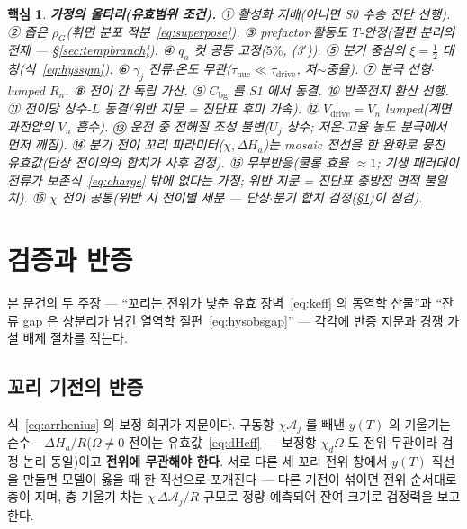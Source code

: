 \documentclass[11pt,a4paper]{article}
\newtheorem*{keybox}{핵심}
\newcommand{\drive}{\mathrm{drive}}
\newcommand{\bg}{\mathrm{bg}}
\begin{document}
\begin{keybox}
\textbf{가정의 울타리(유효범위 조건).}
① 활성화 지배(아니면 S0 수송 진단 선행).
② 좁은 $\rho_G$(휘면 분포 적분~\eqref{eq:superpose}).
③ prefactor$\cdot$활동도 $T$-안정(절편 분리의 전제 — \S\ref{sec:tempbranch}).
④ $q_a$ 컷 공통 고정($5\%$, (3$'$)).
⑤ 분기 중심의 $\xi=\tfrac12$ 대칭(식~\eqref{eq:hyssym}).
⑥ $\gamma_j$ 전류$\cdot$온도 무관($\tau_{\mathrm{nuc}}\ll\tau_{\mathrm{drive}}$, 저$\sim$중율).
⑦ 분극 선형$\cdot$lumped $R_n$.
⑧ 전이 간 독립 가산.
⑨ $C_\bg$ 를 S1 에서 동결.
⑩ 반쪽전지 환산 선행.
⑪ 전이당 상수-$L$ 동결(위반 지문 = 진단표 후미 가속).
⑫ $V_\drive=V_n$ lumped(계면 과전압의 $V_n$ 흡수).
⑬ 운전 중 전해질 조성 불변($U_j$ 상수; 저온$\cdot$고율 농도 분극에서 먼저 깨짐).
⑭ 분기 전이 꼬리 파라미터($\chi,\Delta H_a$)는 mosaic 전선을 한 완화로 뭉친 \emph{유효값}(단상 전이와의 합치가 사후 검정).
⑮ 무부반응(쿨롱 효율 $\approx1$; 기생 패러데이 전류가 보존식~\eqref{eq:charge} 밖에 없다는 가정; 위반 지문 = 진단표 충방전 면적 불일치).
⑯ $\chi$ 전이 공통(위반 시 전이별 세분 — 단상$\cdot$분기 합치 검정(\S\ref{sec:falsify})이 점검).
\end{keybox}

\section{검증과 반증}\label{sec:falsify}
본 문건의 두 주장 — ``꼬리는 전위가 낮춘 유효 장벽~\eqref{eq:keff} 의 동역학 산물''과 ``잔류 gap 은 상분리가 남긴 열역학 절편~\eqref{eq:hysobsgap}'' — 각각에 반증 지문과 경쟁 가설 배제 절차를 적는다.

\subsection{꼬리 기전의 반증}
식~\eqref{eq:arrhenius} 의 보정 회귀가 지문이다. 구동항 $\chi\mathcal A_j$ 를 빼낸 $y(T)$ 의 기울기는 순수 $-\Delta H_a/R$($\Omega\ne0$ 전이는 유효값~\eqref{eq:dHeff} — 보정항 $\chi_d\Omega$ 도 전위 무관이라 검정 논리 동일)이고 \textbf{전위에 무관해야 한다}. 서로 다른 세 꼬리 전위 창에서 $y(T)$ 직선을 만들면 모델이 옳을 때 한 직선으로 포개진다 — 다른 기전이 섞이면 전위 순서대로 층이 지며, 층 기울기 차는 $\chi\,\Delta\mathcal A_j/R$ 규모로 정량 예측되어 잔여 크기로 검정력을 보고한다.
\end{document}
